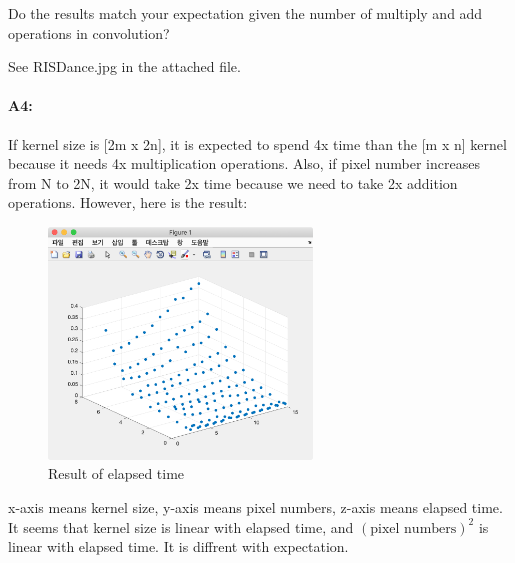 	Do the results match your expectation given the number of multiply and add operations in convolution?
	
	See RISDance.jpg in the attached file.
	
	\paragraph{A4:} If kernel size is [2m x 2n], it is expected to spend 4x time than the [m x n] kernel because it needs 4x multiplication operations.
	Also, if pixel number increases from N to 2N, it would take 2x time because we need to take 2x addition operations.
	However, here is the result:

	\begin{figure}[h]
		\centering
		\includegraphics[width=7cm]{tictoc.png}
		\caption{Result of elapsed time}
		\label{fig:tic toc result}
	\end{figure}

	x-axis means kernel size, y-axis means pixel numbers, z-axis means elapsed time.
	It seems that kernel size is linear with elapsed time, and $(\text{pixel numbers})^2$ is linear with elapsed time. It is diffrent with expectation.
	
	
	
	
	
	
	
	
